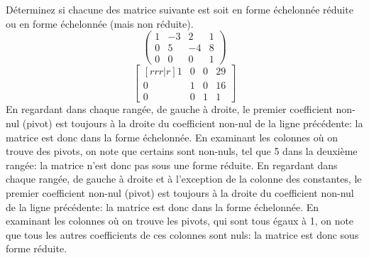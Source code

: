 \begin{exemple}
	Déterminez si chacune des matrice suivante est soit en forme échelonnée réduite ou en forme échelonnée (mais non réduite).
	\[
	\begin{pmatrix}
	1 & -3 & 2 & 1\\
	0 & 5& -4 & 8\\
	0&0&0&1
	\end{pmatrix}
	\]
	\[
	\begin{bmatrix}[rrr|r]
	1 & 0 & 0 & 29\\
	0 & 1& 0 & 16\\
	0&0&1&1
	\end{bmatrix}
	\]
	\solution
	 En regardant dans chaque rangée, de gauche à droite, le premier coefficient non-nul (pivot) est toujours à
	la droite du coefficient non-nul de la ligne précédente: la matrice est donc dans la forme échelonnée. 
	 En examinant les colonnes où on trouve des pivots, 
	 on note que certains sont non-nuls, tel que 5 dans la deuxième rangée: la matrice n'est donc pas sous une forme réduite.
	 En regardant dans chaque rangée, de gauche à droite et à l'exception de la colonne des constantes, le premier coefficient non-nul (pivot) est toujours à la droite du coefficient non-nul de la ligne précédente: la matrice est donc dans la forme échelonnée.  
	En examinant les colonnes où on trouve les pivots, qui sont tous égaux à 1, on note que 
	tous les autres coefficients de ces colonnes sont nuls: la matrice est donc sous forme réduite.
\end{exemple}


